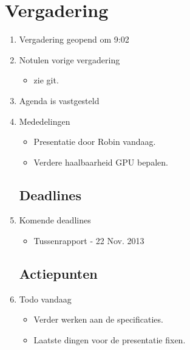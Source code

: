 \documentclass{article}
\begin{document}
\section*{Vergadering}
\begin{enumerate}
	
	\subsection*{Vooraf}
	\item Vergadering geopend om 9:02 %
	\item Notulen vorige vergadering
	\begin{itemize}
		\item zie git.
	\end{itemize}
	\item Agenda is vastgesteld
	\item Mededelingen
	\begin{itemize}
		\item Presentatie door Robin vandaag.
		\item Verdere haalbaarheid GPU bepalen.
	\end{itemize}

	\subsection*{Deadlines}
	\item Komende deadlines
	\begin{itemize}
		\item Tussenrapport - 22 Nov. 2013
	\end{itemize}

	

	\subsection*{Actiepunten}
	\item Todo vandaag
	\begin{itemize}
		\item Verder werken aan de specificaties.
		\item Laatste dingen voor de presentatie fixen.
	\end{itemize}


\end{enumerate}
\end{document}
